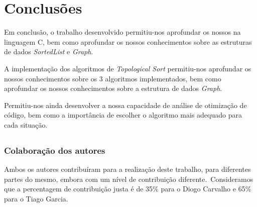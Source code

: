 
\chapter{Conclusões}
\label{ch:conclusoes}

Em conclusão, o trabalho desenvolvido permitiu-nos aprofundar os nossos na linguagem C, bem como aprofundar os nossos conhecimentos sobre as estruturas de dados \textit{SortedList} e \textit{Graph}.

A implementação dos algoritmos de \textit{Topological Sort} permitiu-nos aprofundar os nossos conhecimentos sobre os 3 algoritmos implementados, bem como aprofundar os nossos conhecimentos sobre a estrutura de dados \textit{Graph}.

Permitiu-nos ainda desenvolver a nossa capacidade de análise de otimização de código, bem como a importância de escolher o algoritmo mais adequado para cada situação.

\section*{}
\subsection*{Colaboração dos autores}
\label{subsec:conclusoes:colaboracao-dos-autores}

Ambos os autores contribuíram para a realização deste trabalho, para diferentes partes do mesmo, embora com um nível de contribuição diferente.\ Consideramos que a percentagem de contribuição justa é de 35\% para o Diogo Carvalho e 65\% para o Tiago Garcia.
